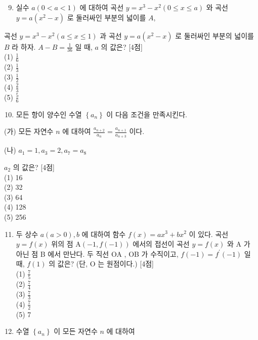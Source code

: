 \documentclass[10pt]{article}
\begin{document}
\begin{enumerate}
  \setcounter{enumi}{8}
  \item 실수 $a(0<a<1)$ 에 대하여 곡선 $y=x^{3}-x^{2}(0 \leq x \leq a)$ 와 곡선 $y=a\left(x^{2}-x\right)$ 로 둘러싸인 부분의 넓이를 $A$,
\end{enumerate}

곡선 $y=x^{3}-x^{2}(a \leq x \leq 1)$ 과 곡선 $y=a\left(x^{2}-x\right)$ 로 둘러싸인 부분의 넓이를 $B$ 라 하자. $A-B=\frac{1}{36}$ 일 때, $a$ 의 값은? [4점]\\
(1) $\frac{1}{6}$\\
(2) $\frac{1}{3}$\\
(3) $\frac{1}{2}$\\
(4) $\frac{2}{3}$\\
(5) $\frac{5}{6}$

\begin{enumerate}
  \setcounter{enumi}{9}
  \item 모든 항이 양수인 수열 $\left\{a_{n}\right\}$ 이 다음 조건을 만족시킨다.
\end{enumerate}

(가) 모든 자연수 $n$ 에 대하여 $\frac{a_{n+2}}{a_{n}}=\frac{a_{n+1}}{a_{n+3}}$ 이다.

(나) $a_{1}=1, a_{3}=2, a_{7}=a_{8}$

$a_{2}$ 의 값은? [4점]\\
(1) 16\\
(2) 32\\
(3) 64\\
(4) 128\\
(5) 256

\begin{enumerate}
  \setcounter{enumi}{10}
  \item 두 상수 $a(a>0), b$ 에 대하여 함수 $f(x)=a x^{3}+b x^{2}$ 이 있다. 곡선 $y=f(x)$ 위의 점 $\mathrm{A}(-1, f(-1))$ 에서의 접선이 곡선 $y=f(x)$ 와 A 가 아닌 점 B 에서 만난다. 두 직선 OA , OB 가 수직이고, $f(-1)=f^{\prime}(-1)$ 일 때, $f(1)$ 의 값은? (단, O 는 원점이다.) [4점]\\
(1) $\frac{7}{5}$\\
(2) $\frac{7}{4}$\\
(3) $\frac{7}{3}$\\
(4) $\frac{7}{2}$\\
(5) 7

  \item 수열 $\left\{a_{n}\right\}$ 이 모든 자연수 $n$ 에 대하여

\end{enumerate}
\end{document}
